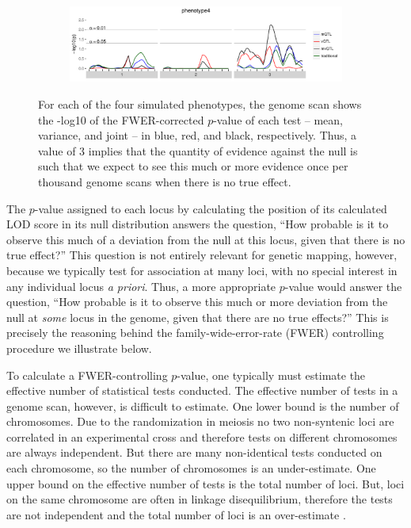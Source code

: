 \documentclass{article}
\begin{document}
\begin{figure}[t]
    \begin{subfigure}[b]{0.9\textwidth}
        \includegraphics[width=\textwidth]{images/empir_p_scan_phenotype4.pdf}
    \end{subfigure}

    \caption{For each of the four simulated phenotypes, the genome scan shows the -log10 of the FWER-corrected $p$-value of each test -- mean, variance, and joint -- in blue, red, and black, respectively. Thus, a value of 3 implies that the quantity of evidence against the null is such that we expect to see this much or more evidence once per thousand genome scans when there is no true effect. \label{fig:empir_p_scans}}
\end{figure}

The $p$-value assigned to each locus by calculating the position of its calculated LOD score in its null distribution answers the question, ``How probable is it to observe this much of a deviation from the null at this locus, given that there is no true effect?''
This question is not entirely relevant for genetic mapping, however, because we typically test for association at many loci, with no special interest in any individual locus \textit{a priori}.
Thus, a more appropriate $p$-value would answer the question, ``How probable is it to observe this much or more deviation from the null at \textit{some} locus in the genome, given that there are no true effects?''
This is precisely the reasoning behind the family-wide-error-rate (FWER) controlling procedure we illustrate below.

To calculate a FWER-controlling $p$-value, one typically must estimate the effective number of statistical tests conducted.
The effective number of tests in a genome scan, however, is difficult to estimate.
One lower bound is the number of chromosomes.
Due to the randomization in meiosis no two non-syntenic loci are correlated in an experimental cross and therefore tests on different chromosomes are always independent.
But there are many non-identical tests conducted on each chromosome, so the number of chromosomes is an under-estimate.
One upper bound on the effective number of tests is the total number of loci.
But, loci on the same chromosome are often in linkage disequilibrium, therefore the tests are not independent and the total number of loci is an over-estimate \citep{Lander1989a}.
\end{document}
